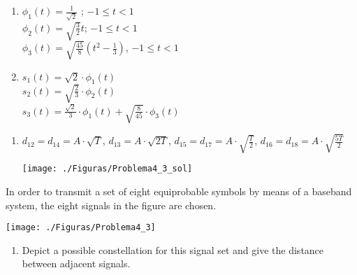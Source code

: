 \documentclass[es,boletin]{uah}
\begin{document}
{
\begin{enumerate}
	\item $\phi_1(t) = \frac{1}{\sqrt{2}}$ ; $-1 \leq t < 1$\\
	 $\phi_2(t) = \sqrt{\frac{3}{2}}t$; $-1 \leq t < 1$\\
	 $\phi_3(t) = \sqrt{\frac{45}{8}}\left ( t^2 - \frac{1}{3}\right )$, $-1 \leq t < 1$
	\item $s_1(t) = \sqrt{2}\cdot \phi_1(t)$\\
		 $s_2(t)=\sqrt{\frac{2}{3}} \cdot \phi_2(t)$\\
		  $s_3(t) = \frac{\sqrt{2}}{3}\cdot \phi_1(t) + \sqrt{\frac{8}{45}} \cdot \phi_3(t)$
\end{enumerate}
}


\newpage

{
\begin{enumerate}
	\item $d_{12} = d_{14} = A \cdot \sqrt{T}$, $d_{13} = A \cdot \sqrt{2T}$, $d_{15}=d_{17} = A \cdot \sqrt{\frac{T}{2}}$, $d_{16}=d_{18} = A \cdot \sqrt{\frac{5T}{2}}$
	 
{\begin{figure*}[h!]\centering\texttt{[image: ./Figuras/Problema4\_3\_sol]}\end{figure*}}

\end{enumerate}
}
{

In order to transmit a set of eight equiprobable symbols by means of a baseband system, the eight signals in the figure are chosen.


{\begin{figure*}[h!]\centering\texttt{[image: ./Figuras/Problema4\_3]}\end{figure*}}


\begin{enumerate}
	\item Depict a possible constellation for this signal set and give the distance between adjacent signals.
\end{enumerate}

}
\end{document}
